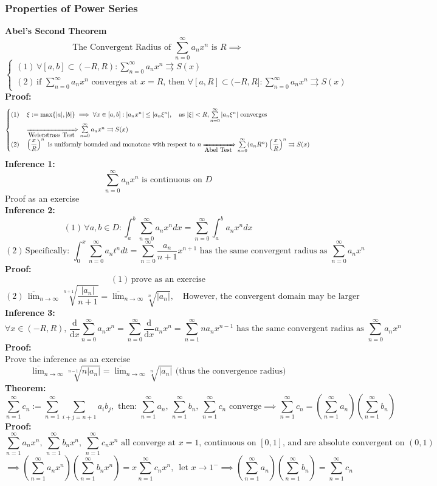 \documentclass{article}
\newcommand{\ucov}{\rightrightarrows}
\newcommand{\infsum}{\sum\limits_{n=1}^\infty}
\newcommand{\difx}{\dfrac{\mbox{d}}{\mbox{d}x}}
\newcommand{\0}{{\bf{0}}}
\begin{document}
\subsubsection{Properties of Power Series}
\textbf{Abel's Second Theorem}
$$\mbox{The Convergent Radius of }\sum_{n=0}^\infty a_nx^n\mbox{ is }R\implies$$
$$\begin{cases}
    (1)\,\forall [a,b]\subset(-R,R):\sum\limits_{n=0}^\infty a_nx^n\ucov S(x)\\
    (2)\,\mbox{if }\sum\limits_{n=0}^\infty a_nx^n\mbox{ converges at }x=R\mbox{, then }\forall [a,R]\subset(-R,R]:\sum\limits_{n=0}^\infty a_nx^n\ucov S(x)
\end{cases}$$
\textbf{Proof:}
$$\begin{cases}
    (1)\,&\xi:=\max\{|a|,|b|\}\implies\forall x\in[a,b]:|a_nx^n|\le|a_n\xi^n|,\quad\mbox{as }|\xi|<R,\sum\limits_{n=0}^\infty|a_n\xi^n|\mbox{ converges}\\
    &\xRightarrow[\mbox{Weierstrass Test}]{}\sum\limits_{n=0}^\infty a_nx^n\ucov S(x)\\
    (2)\,&\left(\dfrac{x}{R}\right)^n\mbox{ is uniformly bounded and monotone with respect to }n\xRightarrow[\mbox{Abel Test}]{}\sum\limits_{n=0}^\infty(a_nR^n)\left(\dfrac{x}{R}\right)^n\ucov S(x)
\end{cases}$$
\textbf{Inference 1:}
$$\sum\limits_{n=0}^\infty a_nx^n\mbox{ is continuous on }D$$
\null\hfill{Proof as an exercise}\\
\textbf{Inference 2:}
$$(1)\,\forall a,b\in D:\int_a^b\sum_{n=0}^\infty a_nx^ndx=\sum_{n=0}^\infty\int_a^ba_nx^ndx$$
$$(2)\,\mbox{Specifically: }\int_0^x\sum_{n=0}^\infty a_nt^ndt=\sum_{n=0}^\infty\dfrac{a_n}{n+1}x^{n+1}\mbox{ has the same convergent radius as }\sum_{n=0}^\infty a_nx^n$$
\textbf{Proof:}
$$(1)\,\mbox{prove as an exercise}$$
$$(2)\,\overline{\lim}_{n\to\infty}\sqrt[n+1]{\frac{|a_n|}{n+1}}=\overline{\lim}_{n\to\infty}\sqrt[n]{|a_n|},\quad\mbox{However, the convergent domain may be larger}$$
\textbf{Inference 3:}
$$\forall x\in(-R,R),\,\difx\sum_{n=0}^\infty a_nx^n=\sum_{n=0}^\infty\difx a_nx^n=\infsum na_nx^{n-1}\mbox{ has the same convergent radius as }\sum_{n=0}^\infty a_nx^n$$
\textbf{Proof:}\\
Prove the inference as an exercise
$$\overline{\lim}_{n\to\infty}\sqrt[n-1]{n|a_n|}=\overline{\lim}_{n\to\infty}\sqrt[n]{|a_n|}\mbox{ (thus the convergence radius)}$$
\textbf{Theorem:}
$$\infsum c_n:=\infsum\sum_{i+j=n+1}a_ib_j,\mbox{ then: }\infsum a_n,\,\infsum b_n,\,\infsum c_n\mbox{ converge}\implies\infsum c_n=\left(\infsum a_n\right)\left(\infsum b_n\right)$$
\textbf{Proof:}
$$\infsum a_nx^n,\,\infsum b_nx^n,\,\infsum c_nx^n\mbox{ all converge at }x=1\mbox{, continuous on }[0,1]\mbox{, and are absolute convergent on }(0,1)$$
$$\implies\left(\infsum a_nx^n\right)\left(\infsum b_nx^n\right)=x\infsum c_nx^n,\,\mbox{ let }x\to1^-\implies\left(\infsum a_n\right)\left(\infsum b_n\right)=\infsum c_n$$
\end{document}
